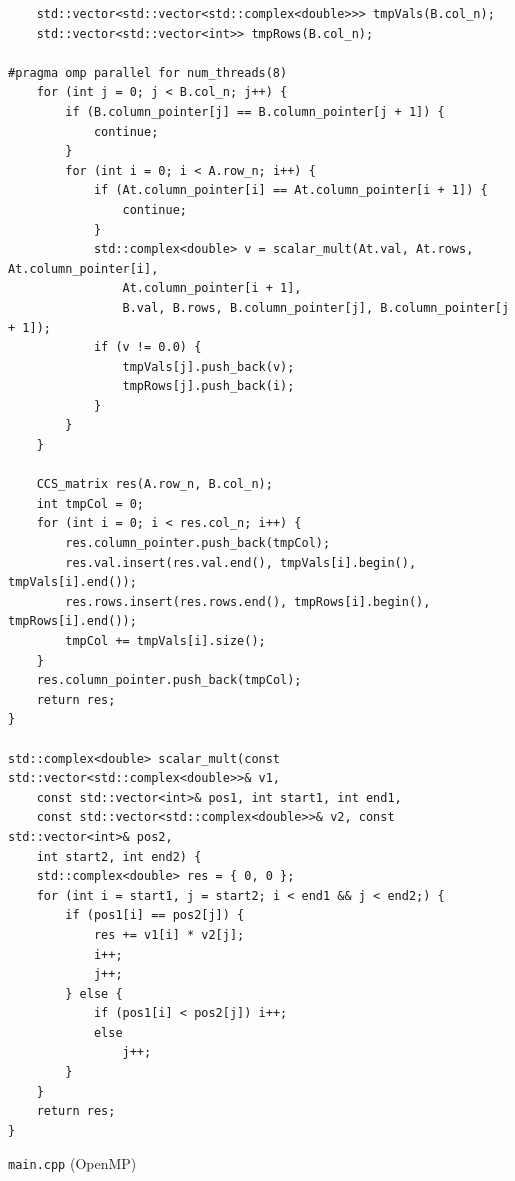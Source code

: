 \documentclass{report}
\begin{document}
\begin{lstlisting}
    std::vector<std::vector<std::complex<double>>> tmpVals(B.col_n);
    std::vector<std::vector<int>> tmpRows(B.col_n);

#pragma omp parallel for num_threads(8)
    for (int j = 0; j < B.col_n; j++) {
        if (B.column_pointer[j] == B.column_pointer[j + 1]) {
            continue;
        }
        for (int i = 0; i < A.row_n; i++) {
            if (At.column_pointer[i] == At.column_pointer[i + 1]) {
                continue;
            }
            std::complex<double> v = scalar_mult(At.val, At.rows, At.column_pointer[i],
                At.column_pointer[i + 1],
                B.val, B.rows, B.column_pointer[j], B.column_pointer[j + 1]);
            if (v != 0.0) {
                tmpVals[j].push_back(v);
                tmpRows[j].push_back(i);
            }
        }
    }

    CCS_matrix res(A.row_n, B.col_n);
    int tmpCol = 0;
    for (int i = 0; i < res.col_n; i++) {
        res.column_pointer.push_back(tmpCol);
        res.val.insert(res.val.end(), tmpVals[i].begin(), tmpVals[i].end());
        res.rows.insert(res.rows.end(), tmpRows[i].begin(), tmpRows[i].end());
        tmpCol += tmpVals[i].size();
    }
    res.column_pointer.push_back(tmpCol);
    return res;
}

std::complex<double> scalar_mult(const std::vector<std::complex<double>>& v1,
    const std::vector<int>& pos1, int start1, int end1,
    const std::vector<std::complex<double>>& v2, const std::vector<int>& pos2,
    int start2, int end2) {
    std::complex<double> res = { 0, 0 };
    for (int i = start1, j = start2; i < end1 && j < end2;) {
        if (pos1[i] == pos2[j]) {
            res += v1[i] * v2[j];
            i++;
            j++;
        } else {
            if (pos1[i] < pos2[j]) i++;
            else
                j++;
        }
    }
    return res;
}

\end{lstlisting}
\verb|main.cpp| (OpenMP)
\end{document}

